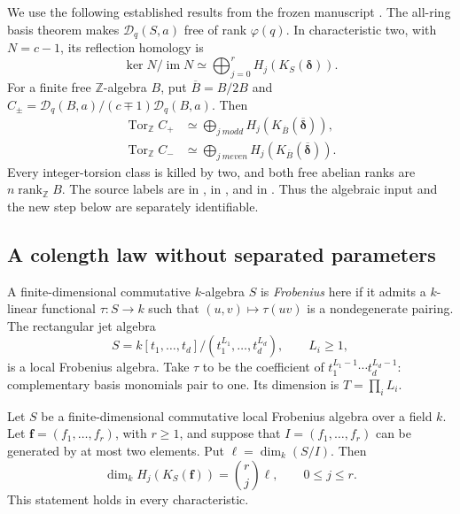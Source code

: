 We use the following established results from the frozen manuscript \cite{repoJets}.
The all-ring basis theorem makes $\mathcal D_q(S,a)$ free of rank
$\varphi(q)$. In characteristic two, with $N=c-1$, its reflection homology is
\begin{equation}\label{ns:eq:input-koszul}
 \ker N/\operatorname{im}N
 \simeq\bigoplus_{j=0}^r H_j(K_S(\boldsymbol\delta)).
\end{equation}
For a finite free $\mathbb Z$-algebra $B$, put $\overline B=B/2B$ and
$C_\pm=\mathcal D_q(B,a)/(c\mp1)\mathcal D_q(B,a)$. Then
\begin{align}
 \operatorname{Tor}_{\mathbb Z}C_+
 &\simeq\bigoplus_{j\ {
m odd}}
 H_j(K_{\overline B}(\overline{\boldsymbol\delta})),
 \label{ns:eq:input-plus}\\
 \operatorname{Tor}_{\mathbb Z}C_-
 &\simeq\bigoplus_{j\ {
m even}}
 H_j(K_{\overline B}(\overline{\boldsymbol\delta})).
 \label{ns:eq:input-minus}
\end{align}
Every integer-torsion class is killed by two, and both free abelian ranks are
$n\operatorname{rank}_{\mathbb Z}B$. The source labels are
 in
,
 in
, and
 in
. Thus the algebraic input and the new step below
are separately identifiable.

\subsection{A colength law without separated parameters}

A finite-dimensional commutative $k$-algebra $S$ is \emph{Frobenius} here if it
admits a $k$-linear functional $\tau:S\to k$ such that $(u,v)\mapsto\tau(uv)$
is a nondegenerate pairing. The rectangular jet algebra
\begin{equation}\label{ns:eq:rectangular}
 S=k[t_1,\ldots,t_d]/(t_1^{L_1},\ldots,t_d^{L_d}),\qquad L_i\ge1,
\end{equation}
is a local Frobenius algebra. Take $\tau$ to be the coefficient of
$t_1^{L_1-1}\cdots t_d^{L_d-1}$: complementary basis monomials pair to one.
Its dimension is $T=\prod_iL_i$.

\begin{theorem}\label{ns:thm:two-generator}
Let $S$ be a finite-dimensional commutative local Frobenius algebra over a
field $k$. Let $\boldsymbol f=(f_1,\ldots,f_r)$, with $r\ge1$, and suppose
that $I=(f_1,\ldots,f_r)$ can be generated by at most two elements. Put
$\ell=\dim_k(S/I)$. Then
\begin{equation}\label{ns:eq:binomial}
 \dim_k H_j(K_S(\boldsymbol f))=\binom rj\ell,
 \qquad 0\le j\le r.
\end{equation}
This statement holds in every characteristic.
\end{theorem}

